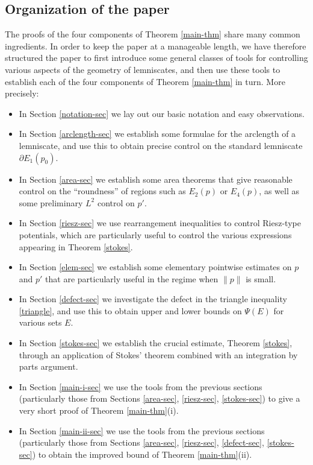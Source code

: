 \documentclass[12pt]{amsart}
\begin{document}
\subsection{Organization of the paper}

The proofs of the four components of Theorem \ref{main-thm} share many common ingredients.  In order to keep the paper at a manageable length, we have therefore structured the paper to first introduce some general classes of tools for controlling various aspects of the geometry of lemniscates, and then use these tools to establish each of the four components of Theorem \ref{main-thm} in turn. More precisely:

\begin{itemize}
    \item In Section \ref{notation-sec} we lay out our basic notation and easy observations.
    \item In Section \ref{arclength-sec} we establish some formulae for the arclength of a lemniscate, and use this to obtain precise control on the standard lemniscate $\partial E_1(p_0)$.
    \item In Section \ref{area-sec} we establish some area theorems that give reasonable control on the ``roundness'' of regions such as $E_2(p)$ or $E_4(p)$, as well as some preliminary $L^2$ control on $p'$.
    \item In Section \ref{riesz-sec} we use rearrangement inequalities to control Riesz-type potentials, which are particularly useful to control the various expressions appearing in Theorem \ref{stokes}.
    \item In Section \ref{elem-sec} we establish some elementary pointwise estimates on $p$ and $p'$ that are particularly useful in the regime when $\|p\|$ is small.
    \item In Section \ref{defect-sec} we investigate the defect in the triangle inequality \eqref{triangle}, and use this to obtain upper and lower bounds on $\Psi(E)$ for various sets $E$.
    \item In Section \ref{stokes-sec} we establish the crucial estimate, Theorem \ref{stokes}, through an application of Stokes' theorem combined with an integration by parts argument.
    \item In Section \ref{main-i-sec} we use the tools from the previous sections (particularly those from Sections \ref{area-sec}, \ref{riesz-sec}, \ref{stokes-sec}) to give a very short proof of Theorem \ref{main-thm}(i).
    \item In Section \ref{main-ii-sec} we use the tools from the previous sections (particularly those from Sections \ref{area-sec}, \ref{riesz-sec}, \ref{defect-sec}, \ref{stokes-sec}) to obtain the improved bound of Theorem \ref{main-thm}(ii).

\end{itemize}
\end{document}
